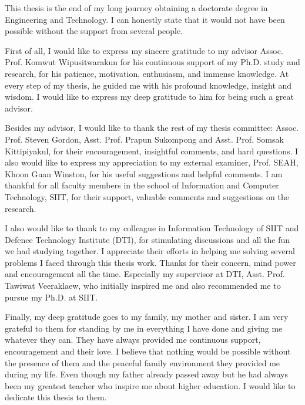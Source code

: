 %

This thesis is the end of my long journey obtaining a doctorate degree in Engineering and Technology. 
I can honestly state that it would not have been possible without the support from several people.

First of all, I would like to express my sincere gratitude to my advisor Assoc. Prof. Komwut Wipusitwarakun for his continuous support of my Ph.D. study and research, for his patience, motivation, enthusiasm, and immense knowledge.
At every step of my thesis, he guided me with his profound knowledge, insight and wisdom.
I would like to express my deep gratitude to him for being such a great advisor. 

Besides my advisor, I would like to thank the rest of my thesis committee: Assoc. Prof. Steven Gordon, Asst. Prof. Prapun Sukompong and Asst. Prof. Somsak Kittipiyakul, for their encouragement, insightful comments, and hard questions. I also would like to express my appreciation to my external examiner, Prof. SEAH, Khoon Guan Winston, for his useful suggestions and helpful comments. 
I am thankful for all faculty members in the school of Information and Computer Technology, SIIT, for their support, valuable comments and suggestions on the research.

I also would like to thank to my colleague in Information Technology of SIIT and Defence Technology Institute (DTI), for stimulating discussions and all the fun we had studying together. 
I appreciate their efforts in helping me solving several problems I faced through this thesis work.
Thanks for their concern, mind power and encouragement all the time.
Especially my supervisor at DTI, Asst. Prof. Tawiwat Veeraklaew, who initially inspired me and also recommended me to pursue my Ph.D. at SIIT.

Finally, my deep gratitude goes to my family, my mother and sister.
I am very grateful to them for standing by me in everything I have done and giving me whatever they can.
They have always provided me continuous support, encouragement and their love.
I believe that nothing would be possible without the presence of them and the peaceful family environment they provided me during my life.
Even though my father already passed away but he had always been my greatest teacher who inspire me about higher education. 
I would like to dedicate this thesis to them.